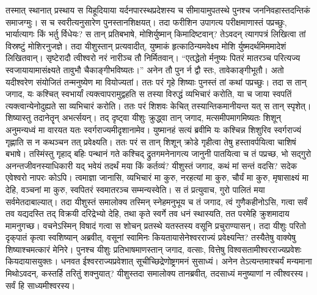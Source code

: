 \adhyAya
{}
\vakya तस्मात् स्थानात् प्रस्थाय स यिहूदियाया यर्दनपारस्थप्रदेशस्य च सीमायामुपतस्थे पुनश्च जननिवहास्तदन्तिकं समाजग्मुः। स च स्वरीत्यनुसारेण पुनस्तानशिक्षयत्।
\vakya तदा फरीशिन उपागत्य परीक्षमाणास्तं पप्रच्छुः, भार्यात्यागः किं भर्तु र्विधेयः?
\vakya स तान् प्रतिबभाषे, मोशिर्युष्मान् किमादिष्टवान्?
\vakya तेऽवदन् त्यागपत्रं लिखित्वा तां विस्रष्टुं मोशिरनुजज्ञे।
\vakya तदा यीशुस्तान् प्रत्यवादीत्, युष्माकं हृत्काठिन्यमवेक्ष्य मोशि र्युष्मदर्थमिममादेशं लिखितवान्।
\vakya सृष्टेरादौ त्वीश्वरो नरं नारीञ्च तौ निर्मितवान्।
\vakya “एतद्धेतो र्मनुष्यः पितरं मातरञ्च परित्यज्य स्वजायायामासंक्ष्यते तावुभौ चैकाङ्गीभविष्यतः।”
\vakya अनेन तौ पुन र्न द्वौ स्तः, तावेकाङ्गीभूतौ।
\vakya अतो यदीश्वरेण संयोजितं तन्मनुष्येण मा वियोज्यतां।
\vakya ततः परं गृहे शिष्याः पुनस्तं तां कथां पप्रच्छुः।
\vakya तदा स तान् जगाद, यः कश्चित् स्वभार्यां त्यक्त्वापरामुद्वहति स तस्या विरुद्धं व्यभिचारं करोति,
\vakya या च जाया स्वपतिं त्यक्त्वान्येनोदुह्यते सा व्यभिचारं करोति।
\vakya ततः परं शिशवः केचित् तस्यान्तिकमानीयन्त यत् स तान् स्पृशेत्। शिष्यास्तु तदानेतॄन् अभर्त्सयन्।
\vakya तद् दृष्ट्वा यीशुः क्रुद्ध्वा तान् जगाद, मत्समीपमागमिष्यतः शिशून् अनुमन्यध्वं मा वारयत यतः स्वर्गराज्यमीदृशानामेव।
\vakya युष्मानहं सत्यं ब्रवीमि यः कश्चिन्न शिशुरिव स्वर्गराज्यं गृह्णाति स न कथञ्चन तत् प्रवेक्ष्यति।
\vakya ततः परं स तान् शिशून् क्रोडे गृहीत्वा तेषु हस्तावर्पयित्वा चाशिषं बभाषे।
\vakya तस्मिंस्तु गृहाद् बहिः पन्थानं गते कश्चिद् द्रुतगमनेनागत्य जानुनी पातयित्वा च तं पप्रच्छ, भो सद्गुरो अनन्तजीवनस्याधिकारी यद् भवेयं तदर्थं मया किं कर्तव्यं?
\vakya यीशुस्तं जगाद, कथं मां सन्तं वदसि? सदेक एवेश्वरो नापरः कोऽपि।
\vakya त्वमाज्ञा जानासि, व्यभिचारं मा कुरु, नरहत्यां मा कुरु, चौर्यं मा कुरु, मृषासाक्ष्यं मा देहि, वञ्चनां मा कुरु, स्वपितरं स्वमातरञ्च सम्मन्यस्वेति।
\vakya स तं प्रत्युवाच, गुरो पालितं मया सर्वमेतदाबाल्यात्।
\vakya तदा यीशुस्तं समालोक्य तस्मिन् स्नेहमनुभूय च तं जगाद, त्वं गुणैकहीनोऽसि, गत्वा सर्वं तव यद्यदस्ति तद् विक्रयी दरिद्रेभ्यो देहि, तथा कृते स्वर्गे तव धनं स्थास्यति, तत परमेहि क्रुशमादाय मामनुगच्छ।
\vakya वचनेऽस्मिन् विषादं गत्वा स शोचन् प्रतस्थे यतस्तस्य वसूनि प्रचुराण्यासन्।
\vakya तदा यीशुः परितो दृक्‌पातं कृत्वा स्वशिष्यान् अब्रवीत्, वसूनां स्वामिनः कियतायासेनेश्वरराज्यं प्रवेक्ष्यन्ति?
\vakya तस्यैतेषु वाक्येषु शिष्याश्चमत्कारं मेनिरे। पुनश्च यीशुः प्रतिभाषमाणस्तान् जगाद, वत्साः, वित्तेषु विश्वसतामीश्वरराज्यप्रवेशः कियदायासयुक्तः।
\vakya धनवत ईश्वरराज्यप्रवेशात् सूचीच्छिद्रेणोष्ट्रगमनं सुसाध्यं।
\vakya अनेन तेऽत्यन्तमाश्चर्यं मन्यमाना मिथोऽवदन्, कस्तर्हि तरितुं शक्नुयात्?
\vakya यीशुस्तदा समालोक्य तानब्रवीत्, तदसाध्यं मनुष्याणां न त्वीश्वरस्य। सर्वं हि साध्यमीश्वरस्य।
